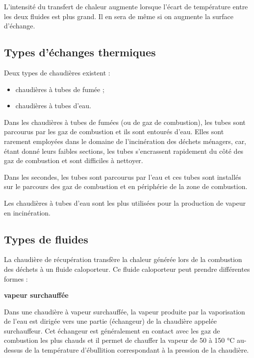 L’intensité du transfert de chaleur augmente lorsque l’écart de température entre les deux fluides est plus grand. Il en sera de même si on augmente la surface d’échange.


\subsection{Types d'échanges thermiques}

Deux types de chaudières existent :
\begin{itemize}
\item	chaudières à tubes de fumée ;
\item	chaudières à tubes d'eau.
\end{itemize} 

Dans les chaudières à tubes de fumées (ou de gaz de combustion), les tubes sont parcourus par les gaz de combustion et ils sont entourés d’eau. Elles sont rarement employées dans le domaine de l’incinération des déchets ménagers, car, étant donné leurs faibles sections, les tubes s’encrassent rapidement du côté des gaz de combustion et sont difficiles à nettoyer.
\vspace{0.3cm}

Dans les secondes, les tubes sont parcourus par l’eau et ces tubes sont installés sur le parcours des gaz de combustion et en périphérie de la zone de combustion.
\vspace{0.3cm}

Les chaudières à tubes d’eau sont les plus utilisées pour la production de vapeur en incinération.



\subsection{Types de fluides}

La chaudière de récupération transfère la chaleur générée lors de la combustion des déchets à un fluide caloporteur.
Ce fluide caloporteur peut prendre différentes formes : 

\vspace{0.3cm}
\textbf{vapeur surchauffée}
\vspace{0.3cm}

Dans une chaudière à vapeur surchauffée, la vapeur produite par la vaporisation de l’eau est dirigée vers une partie (échangeur) de la chaudière appelée surchauffeur. Cet échangeur est généralement en contact avec les gaz de combustion les plus chauds et il permet de chauffer la vapeur de 50 à 150 °C au-dessus de la température d’ébullition correspondant à la pression de la chaudière.

